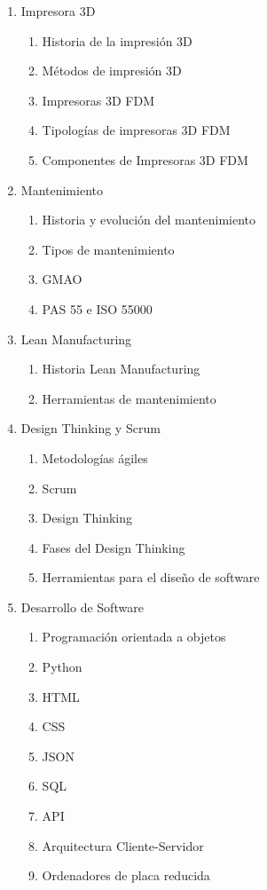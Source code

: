 		\begin{enumerate}
			\item Impresora 3D
				\begin{enumerate}
					\item Historia de la impresión 3D	
					\item Métodos de impresión 3D
					\item Impresoras 3D FDM
					\item Tipologías de impresoras 3D FDM 
					\item Componentes de Impresoras 3D FDM	
				\end{enumerate}
			\item Mantenimiento
				\begin{enumerate}
					\item Historia y evolución del mantenimiento
					\item Tipos de mantenimiento
					\item GMAO 
					\item PAS 55 e ISO 55000
					\clearpage
				\end{enumerate}					
			\item Lean Manufacturing
				\begin{enumerate}
					\item Historia Lean Manufacturing
					\item Herramientas de mantenimiento
				\end{enumerate}
			\item Design Thinking y Scrum
				\begin{enumerate}
					\item Metodologías ágiles 
					\item Scrum 					
					\item Design Thinking
					\item Fases del Design Thinking
					\item Herramientas para el diseño de software
				\end{enumerate}
			\item Desarrollo de Software
				\begin{enumerate}	
					\item Programación orientada a objetos
					\item Python
					\item HTML
					\item CSS
					\item JSON
					\item SQL
					\item API  
					\item Arquitectura Cliente-Servidor
					\item Ordenadores de placa reducida 
				\end{enumerate}						
		\end{enumerate}
		\clearpage
